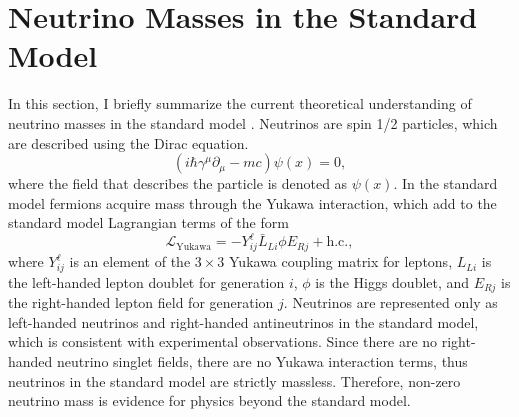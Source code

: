 \section{Neutrino Masses in the Standard Model}
\label{sec:chap2-nu-mass-sm}

In this section, I briefly summarize the current theoretical understanding of neutrino masses in the standard model \cite{nu_physics1, nu_physics2, nu_physics3}. Neutrinos are spin 1/2 particles, which are described using the Dirac equation. 
\begin{equation}
    (i\hbar\gamma^\mu\partial_\mu-mc)\psi(x)=0, 
\end{equation}
where the field that describes the particle is denoted as $\psi(x)$. In the standard model fermions acquire mass through the Yukawa interaction, which add to the standard model Lagrangian terms of the form 
\begin{equation}
    \mathcal{L}_\textrm{Yukawa}=-Y^\ell_{ij}\bar{L}_{Li}\phi E_{Rj}+\textrm{h.c.},
\end{equation}
where $Y_{ij}^\ell$ is an element of the $3\times3$ Yukawa coupling matrix for leptons, $L_{Li}$ is the left-handed lepton doublet for generation $i$, $\phi$ is the Higgs doublet, and $E_{Rj}$ is the right-handed lepton field for generation $j$. Neutrinos are represented only as left-handed neutrinos and right-handed antineutrinos in the standard model, which is consistent with experimental observations. Since there are no right-handed neutrino singlet fields, there are no Yukawa interaction terms, thus neutrinos in the standard model are strictly massless. Therefore, non-zero neutrino mass is evidence for physics beyond the standard model. 

